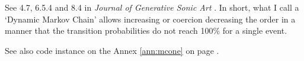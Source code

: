 \bigskip
\bigskip


\bigskip

See  4.7, 6.5.4 and 8.4 in \textsl{Journal of Generative Sonic Art} \citep{yi}. In short, what I call a `Dynamic Markov Chain' allows increasing or coercion decreasing the order in a manner that the transition probabilities do not reach 100\% for a single event.
 
See also code instance on the Annex \ref{ann:mcone} on page \pageref{ann:mcone}.

%
%

